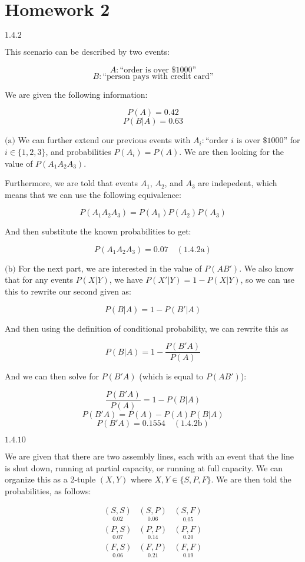 \documentclass{article}
\newcommand{\problem}[2]{$\boxed{\text{#1.#2}}$}
\newcommand{\subproblem}[3]{$\boxed{\text{(#3)}}$}
\newcommand{\subsolution}[4]{\boxed{#4\quad(\text{#1.#2#3})}}
\begin{document}
\section*{Homework 2}

%
\problem{1.4}{2}

This scenario can be described by two events:

\[
A:\text{``order is over \$1000''}
\] \[
B:\text{``person pays with credit card''}
\]

We are given the following information:

\[
P(A)=0.42
\] \[
P(B|A)=0.63
\]

%
\subproblem{1.4}{2}{a} We can further extend our previous events with
$A_i:\text{``order $i$ is over \$1000''}$ for $i\in\{1,2,3\}$, and
probabilities $P(A_i)=P(A)$. We are then looking for the value of
$P(A_1A_2A_3)$.

Furthermore, we are told that events $A_1$, $A_2$, and $A_3$ are
indepedent, which means that we can use the following equivalence:

\[
P(A_1A_2A_3)=P(A_1)P(A_2)P(A_3)
\]

And then substitute the known probabilities to get:

\[
\subsolution{1.4}{2}{a}{P(A_1A_2A_3)=0.07}
\]

%
\subproblem{1.4}{2}{b} For the next part, we are interested in the value of
$P(AB')$. We also know that for any events $P(X|Y)$, we have
$P(X'|Y)=1-P(X|Y)$, so we can use this to rewrite our second given as:

\[
P(B|A)=1-P(B'|A)
\]

And then using the definition of conditional probability, we can
rewrite this as

\[
P(B|A)=1 - \dfrac{P(B'A)}{P(A)}
\]

And we can then solve for $P(B'A)$ (which is equal to $P(AB')$):

\[
\dfrac{P(B'A)}{P(A)}=1-P(B|A)
\] \[
P(B'A)=P(A)-P(A)P(B|A)
\] \[
\subsolution{1.4}{2}{b}{P(B'A)=0.1554}
\]

%
\problem{1.4}{10}

We are given that there are two assembly lines, each with an event
that the line is shut down, running at partial capacity, or running at
full capacity. We can organize this as a 2-tuple $(X,Y)$ where
$X,Y\in\{S,P,F\}$. We are then told the probabilities, as follows:

\[
\boxed{\begin{array}{ccc}
\underset{0.02}{(S, S)} & \underset{0.06}{(S, P)} & \underset{0.05}{(S, F)} \\
\underset{0.07}{(P, S)} & \underset{0.14}{(P, P)} & \underset{0.20}{(P, F)} \\
\underset{0.06}{(F, S)} & \underset{0.21}{(F, P)} & \underset{0.19}{(F, F)} \\
\end{array}}
\]
\end{document}
